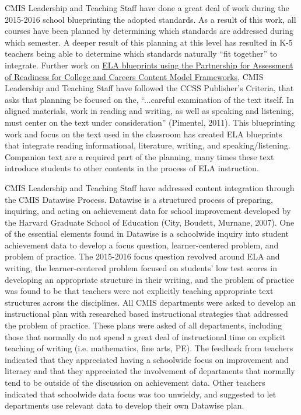 \begin{findings}
CMIS Leadership and Teaching Staff have done a great deal of work during the 2015-2016 school blueprinting the adopted standards. As a result of this work, all courses have been planned by determining which standards are addressed during which semester. A deeper result of this planning at this level has resulted in K-5 teachers being able to determine which standards naturally ``fit together'' to integrate. Further work on \href{https://drive.google.com/drive/folders/0ByVFfrm0zfolfmV1QTNuWFdUVHV3dDVrRFMzUFBMazY0VGs1eWc0cmFjVGcwNDdsQkdrZzA?usp=sharing}{ELA blueprints using the Partnership for Assessment of Readiness for College and Careers Content Model Frameworks}, CMIS Leadership and Teaching Staff have followed the CCSS Publisher’s Criteria, that asks that planning be focused on the, ``...careful examination of the text itself. In aligned materials, work in reading and writing, as well as speaking and listening, must center on the text under consideration'' (Pimentel, 2011). This blueprinting work and focus on the text used in the classroom has created ELA blueprints that integrate reading informational, literature, writing, and speaking/listening. Companion text are a required part of the planning, many times these text introduce students to other contents in the process of ELA instruction. 


CMIS Leadership and Teaching Staff have addressed content integration through the CMIS Datawise Process. Datawise is a structured process of preparing, inquiring, and acting on achievement data for school improvement developed by the Harvard Graduate School of Education (City, Boudett, Murnane, 2007). One of the essential elements found in Datawise is a schoolwide inquiry into student achievement data to develop a focus question, learner-centered problem, and problem of practice. The 2015-2016 focus question revolved around ELA and writing, the learner-centered problem focused on students' low test scores in developing an appropriate structure in their writing, and the problem of practice was found to be that teachers were not explicitly teaching appropriate text structures across the disciplines. All CMIS departments were asked to develop an instructional plan with researched based instructional strategies that addressed the problem of practice. These plans were asked of all departments, including those that normally do not spend a great deal of instructional time on explicit teaching of writing (i.e. mathematics, fine arts, PE). The feedback from teachers indicated that they appreciated having a schoolwide focus on improvement and literacy and that they appreciated the involvement of departments that normally tend to be outside of the discussion on achievement data. Other teachers indicated that schoolwide data focus was too unwieldy, and suggested to let departments use relevant data to develop their own Datawise plan. 


\end{findings}
